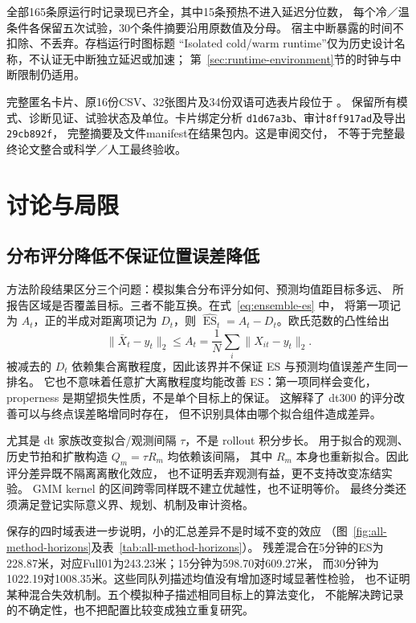 \documentclass[UTF8,11pt]{ctexart}
\newcommand{\ES}{\operatorname{ES}}
\begin{document}
全部165条原运行时记录现已齐全，其中15条预热不进入延迟分位数，
每个冷／温条件各保留五次试验，30个条件摘要沿用原数值及分母。
宿主中断暴露的时间不扣除、不丢弃。存档运行时图标题
“Isolated cold/warm runtime”仅为历史设计名称，不认证无中断独立延迟或加速；
第~\ref{sec:runtime-environment}节的时钟与中断限制仍适用。

完整匿名卡片、原16份CSV、32张图片及34份双语可选表片段位于
。
保留所有模式、诊断见证、试验状态及单位。卡片绑定分析
\texttt{d1d67a3b}、审计\texttt{8ff917ad}及导出\texttt{29cb892f}，
完整摘要及文件manifest在结果包内。这是审阅交付，
不等于完整最终论文整合或科学／人工最终验收。
\FloatBarrier


\section{讨论与局限}
\subsection{分布评分降低不保证位置误差降低}
\label{sec:discussion-score}
方法阶段结果区分三个问题：模拟集合分布评分如何、预测均值距目标多远、
所报告区域是否覆盖目标。三者不能互换。在式~\eqref{eq:ensemble-es} 中，
将第一项记为 $A_t$，正的半成对距离项记为 $D_t$，则
$\widehat{\ES}_t=A_t-D_t$。欧氏范数的凸性给出
\begin{equation}
 \|\bar X_t-y_t\|_2\leq
 A_t=\frac1N\sum_i\|X_{it}-y_t\|_2.
 \label{eq:mean-error-bound}
\end{equation}
被减去的 $D_t$ 依赖集合离散程度，因此该界并不保证 ES 与预测均值误差产生同一排名。
它也不意味着任意扩大离散程度均能改善 ES：第一项同样会变化，
properness 是期望损失性质，不是单个目标上的保证。
这解释了 dt300 的评分改善可以与终点误差略增同时存在，
但不识别具体由哪个拟合组件造成差异。

尤其是 dt 家族改变拟合/观测间隔 $\tau$，不是 rollout 积分步长。
用于拟合的观测、历史节拍和扩散构造 $Q_m=\tau R_m$ 均依赖该间隔，
其中 $R_m$ 本身也重新拟合。因此评分差异既不隔离离散化效应，
也不证明丢弃观测有益，更不支持改变冻结实验。
GMM kernel 的区间跨零同样既不建立优越性，也不证明等价。
最终分类还须满足登记实际意义界、规划、机制及审计资格。

保存的四时域表进一步说明，小的汇总差异不是时域不变的效应
（图~\ref{fig:all-method-horizons}及表~\ref{tab:all-method-horizons}）。
残差混合在5分钟的ES为228.87米，对应Full01为243.23米；15分钟为598.70对609.27米，
而30分钟为1022.19对1008.35米。这些同队列描述均值没有增加逐时域显著性检验，
也不证明某种混合失效机制。五个模拟种子描述相同目标上的算法变化，
不能解决跨记录的不确定性，也不把配置比较变成独立重复研究。
\end{document}
